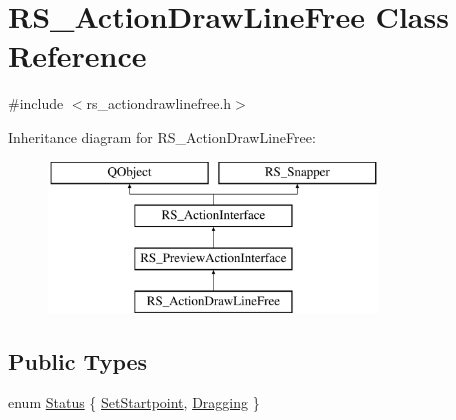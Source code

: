 \hypertarget{classRS__ActionDrawLineFree}{\section{R\-S\-\_\-\-Action\-Draw\-Line\-Free Class Reference}
\label{classRS__ActionDrawLineFree}
}


{\ttfamily \#include $<$rs\-\_\-actiondrawlinefree.\-h$>$}

Inheritance diagram for R\-S\-\_\-\-Action\-Draw\-Line\-Free\-:\begin{figure}[H]
\begin{center}
\leavevmode
\includegraphics[height=4.000000cm]{classRS__ActionDrawLineFree}
\end{center}
\end{figure}
\subsection*{Public Types}
\begin{DoxyCompactItemize}
\item 
enum \hyperlink{classRS__ActionDrawLineFree_a59b4e8f00f06f1be14cd5a45e1d9a529}{Status} \{ \hyperlink{classRS__ActionDrawLineFree_a59b4e8f00f06f1be14cd5a45e1d9a529a63677b142c28b01437778cecaacc74d2}{Set\-Startpoint}, 
\hyperlink{classRS__ActionDrawLineFree_a59b4e8f00f06f1be14cd5a45e1d9a529ad44af31e9ff3bb70f2fb116b34c5cf76}{Dragging}
 \}
\end{DoxyCompactItemize}
